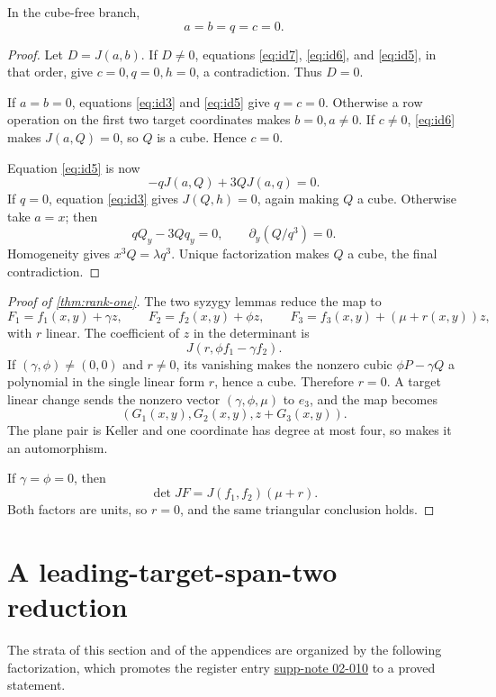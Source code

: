 \documentclass[11pt,reqno]{amsart}
\begin{document}
\begin{lemma}
\label{lem:second-syzygy}
In the cube-free branch,
\[
a=b=q=c=0.
\]
\end{lemma}

\begin{proof}
Let \(D=J(a,b)\).  If \(D\ne0\), equations
\eqref{eq:id7}, \eqref{eq:id6}, and \eqref{eq:id5}, in that order, give
\(c=0,q=0,h=0\), a contradiction.  Thus \(D=0\).

If \(a=b=0\), equations \eqref{eq:id3} and \eqref{eq:id5} give
\(q=c=0\).  Otherwise a row operation on the first two target coordinates
makes \(b=0,a\ne0\).  If \(c\ne0\), \eqref{eq:id6} makes
\(J(a,Q)=0\), so \(Q\) is a cube.  Hence \(c=0\).

Equation \eqref{eq:id5} is now
\[
-qJ(a,Q)+3QJ(a,q)=0.
\]
If \(q=0\), equation \eqref{eq:id3} gives \(J(Q,h)=0\), again making
\(Q\) a cube.  Otherwise take \(a=x\); then
\[
qQ_y-3Qq_y=0,
\qquad
\partial_y(Q/q^3)=0.
\]
Homogeneity gives \(x^3Q=\lambda q^3\).  Unique factorization makes \(Q\)
a cube, the final contradiction.
\end{proof}

\begin{proof}[Proof of \cref{thm:rank-one}]
The two syzygy lemmas reduce the map to
\[
F_1=f_1(x,y)+\gamma z,\qquad
F_2=f_2(x,y)+\phi z,\qquad
F_3=f_3(x,y)+(\mu+r(x,y))z,
\]
with \(r\) linear.  The coefficient of \(z\) in the determinant is
\[
J(r,\phi f_1-\gamma f_2).
\]
If \((\gamma,\phi)\ne(0,0)\) and \(r\ne0\), its vanishing makes the
nonzero cubic \(\phi P-\gamma Q\) a polynomial in the single linear form
\(r\), hence a cube.  Therefore \(r=0\).  A target linear change sends the
nonzero vector \((\gamma,\phi,\mu)\) to \(e_3\), and the map becomes
\[
(G_1(x,y),G_2(x,y),z+G_3(x,y)).
\]
The plane pair is Keller and one coordinate has degree at most four, so
\cite{appelgateOnishi1985} makes it an automorphism.

If \(\gamma=\phi=0\), then
\[
\det JF=J(f_1,f_2)(\mu+r).
\]
Both factors are units, so \(r=0\), and the same triangular conclusion
holds.
\end{proof}

\section{A leading-target-span-two reduction}
\label{sec:span-two}

The strata of this section and of the appendices are organized by the
following factorization, which promotes the register entry
\hyperref[supp-note-02-010]{supp-note 02-010} to a proved statement.
\end{document}
